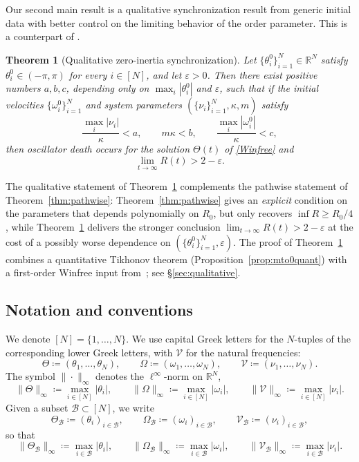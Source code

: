 \documentclass[11pt,reqno]{amsart}
\newcommand{\R}{\mathbb{R}}
\newtheorem{theorem}[lemma]{Theorem}
\theoremstyle{definition}
\theoremstyle{remark}
\begin{document}
Our second main result is a qualitative synchronization result from generic initial data with better control on the limiting behavior of the order parameter. This is a counterpart of \cite[Theorem 1.2]{cho2025inertia}.

\begin{theorem}[Qualitative zero-inertia synchronization]\label{thm:qualitative_mto0}
Let $\{\theta_i^0\}_{i=1}^N\in\R^N$ satisfy $\theta_i^0\in (-\pi,\pi)$
for every $i\in[N]$, and let $\varepsilon>0$. Then
there exist positive numbers $a,b,c$, depending only on $\max_{i}|\theta_i^0|$ and
$\varepsilon$, such that if the initial velocities $\{\omega_i^0\}_{i=1}^N$ and
system parameters $(\{\nu_i\}_{i=1}^N,\kappa,m)$ satisfy
\begin{equation}\label{eq:smallness-2}
\frac{\max_i |\nu_i|}{\kappa}<a,\qquad
m\kappa<b,\qquad \frac{\max_i |\omega^0_i|}{\kappa}<c,
\end{equation}
then oscillator death occurs for the solution $\Theta(t)$ of
\eqref{Winfree} and
\[
\lim_{t\to\infty}R(t)>2-\varepsilon.
\]
\end{theorem}

The qualitative statement of Theorem~\ref{thm:qualitative_mto0}
complements the pathwise statement of
Theorem~\ref{thm:pathwise}: Theorem~\ref{thm:pathwise} gives an
\emph{explicit} condition on the parameters that depends polynomially
on $R_0$, but only recovers $\inf R\ge R_0/4$, while
Theorem~\ref{thm:qualitative_mto0} delivers the stronger conclusion
$\lim_{t\to\infty} R(t)>2-\varepsilon$ at the cost of a possibly worse dependence on
$(\{\theta_i^0\}_{i=1}^N,\varepsilon)$. The proof of
Theorem~\ref{thm:qualitative_mto0} combines a quantitative Tikhonov
theorem (Proposition~\ref{prop:mto0quant}) with a first-order Winfree
input from~\cite{ryoo2026oscillator}; see \S\ref{sec:qualitative}.


\subsection{Notation and conventions}\label{sec:notation}
We denote $[N]=\{1,\dots,N\}$. We use capital Greek letters for the
$N$-tuples of the corresponding lower Greek letters, with $\mathcal V$
for the natural frequencies:
\[
\Theta\coloneqq(\theta_1,\dots,\theta_N),\qquad
\Omega\coloneqq(\omega_1,\dots,\omega_N),\qquad
\mathcal V\coloneqq(\nu_1,\dots,\nu_N).
\]
The symbol $\|\cdot\|_\infty$ denotes the $\ell^\infty$-norm on $\R^N$,
\[
\|\Theta\|_\infty\coloneqq\max_{i\in[N]}|\theta_i|,\qquad
\|\Omega\|_\infty\coloneqq\max_{i\in[N]}|\omega_i|,\qquad
\|\mathcal V\|_\infty\coloneqq\max_{i\in[N]}|\nu_i|.
\]
Given a subset $\mathcal{B}\subset [N]$, we write
\[
\Theta_\mathcal{B}\coloneqq(\theta_i)_{i\in \mathcal{B}},\qquad
\Omega_\mathcal{B}\coloneqq(\omega_i)_{i\in \mathcal{B}},\qquad
\mathcal V_\mathcal{B}\coloneqq(\nu_i)_{i \in \mathcal{B}},
\]
so that
\[
\|\Theta_\mathcal{B}\|_\infty\coloneqq\max_{i\in\mathcal{B}}|\theta_i|,\qquad
\|\Omega_\mathcal{B}\|_\infty\coloneqq\max_{i\in \mathcal{B}}|\omega_i|,\qquad
\|\mathcal V_\mathcal{B}\|_\infty\coloneqq\max_{i\in \mathcal{B}}|\nu_i|.
\]
\end{document}
